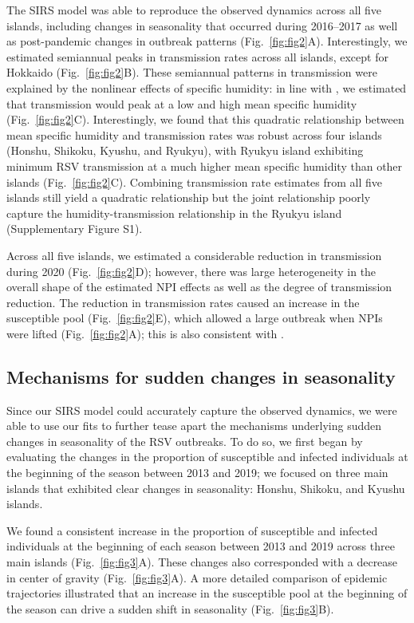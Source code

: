 \documentclass[12pt]{article}
\newcommand{\fref}[1]{Fig.~\ref{fig:#1}}
\begin{document}
The SIRS model was able to reproduce the observed dynamics across all five islands, including changes in seasonality that occurred during 2016--2017 as well as post-pandemic changes in outbreak patterns (\fref{fig2}A).
Interestingly, we estimated semiannual peaks in transmission rates across all islands, except for Hokkaido (\fref{fig2}B).
These semiannual patterns in transmission were explained by the nonlinear effects of specific humidity:
in line with \cite{baker2019epidemic}, we estimated that transmission would peak at a low and high mean specific humidity (\fref{fig2}C).
Interestingly, we found that this quadratic relationship between mean specific humidity and transmission rates was robust across four islands (Honshu, Shikoku, Kyushu, and Ryukyu), with Ryukyu island exhibiting minimum RSV transmission at a much higher mean specific humidity than other islands (\fref{fig2}C).
Combining transmission rate estimates from all five islands still yield a quadratic relationship but the joint relationship poorly capture the humidity-transmission relationship in the Ryukyu island (Supplementary Figure S1).

Across all five islands, we estimated a considerable reduction in transmission during 2020  (\fref{fig2}D);
however, there was large heterogeneity in the overall shape of the estimated NPI effects as well as the degree of transmission reduction.
The reduction in transmission rates caused an increase in the susceptible pool (\fref{fig2}E), which allowed a large outbreak when NPIs were lifted (\fref{fig2}A);
this is also consistent with \cite{baker2019epidemic}.

\subsection*{Mechanisms for sudden changes in seasonality}

Since our SIRS model could accurately capture the observed dynamics, we were able to use our fits to further tease apart the mechanisms underlying sudden changes in seasonality of the RSV outbreaks.
To do so, we first began by evaluating the changes in the proportion of susceptible and infected individuals at the beginning of the season between 2013 and 2019;
we focused on three main islands that exhibited clear changes in seasonality: Honshu, Shikoku, and Kyushu islands. 

We found a consistent increase in the proportion of susceptible and infected individuals at the beginning of each season between 2013 and 2019 across three main islands (\fref{fig3}A).
These changes also corresponded with a decrease in center of gravity (\fref{fig3}A).
A more detailed comparison of epidemic trajectories illustrated that an increase in the susceptible pool at the beginning of the season can drive a sudden shift in seasonality (\fref{fig3}B).
\end{document}
